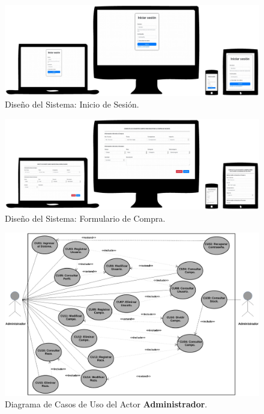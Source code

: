 \documentclass[11pt,oneside]{book}
\begin{document}
\begin{figure}[tbhp]
\centerline{\includegraphics[scale=0.7]{figs/loginForm.pdf}}
\caption{Diseño del Sistema: Inicio de Sesión.}
\label{fig204}
\end{figure}

\begin{figure}[tbhp]
\centerline{\includegraphics[scale=0.7]{figs/compraForm.pdf}}
\caption{Diseño del Sistema: Formulario de Compra.}
\label{fig205}
\end{figure}

%
\begin{figure}[tbhp]
\centerline{\includegraphics[scale=0.5]{figs/Diagrama_CU_Administrador.pdf}}
\caption{Diagrama de Casos de Uso del Actor \textbf{Administrador}.}
\label{Ap101}
\end{figure}
\end{document}
